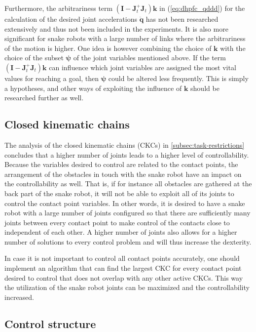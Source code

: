 Furthermore, the arbitrariness term $(\mathbf{I}-  \mathbf{J}_t^+ \mathbf{J}_t)\mathbf{k}$ in (\ref{eq:dhpfc_qddd}) for the calculation of the desired joint accelerations $\ddot{\mathbf{q}}$ has not been researched extensively and thus not been included in the experiments. It is also more significant for snake robots with a large number of links where the arbitrariness of the motion is higher. One idea is however combining the choice of $\mathbf{k}$ with the choice of the subset $\boldsymbol{\psi}$ of the joint variables mentioned above. If the term $(\mathbf{I}-  \mathbf{J}_t^+ \mathbf{J}_t)\mathbf{k}$ can influence which joint variables are assigned the most vital values for reaching a goal, then $\boldsymbol{\psi}$ could be altered less frequently. This is simply a hypotheses, and other ways of exploiting the influence of $\mathbf{k}$ should be researched further as well.

\subsection{Closed kinematic chains}

The analysis of the closed kinematic chains (CKCs) in \ref{subsec:task-restrictions} concludes that a higher number of joints leads to a higher level of controllability. Because the variables desired to control are related to the contact points, the arrangement of the obstacles in touch with the snake robot have an impact on the controllability as well. That is, if for instance all obstacles are gathered at the back part of the snake robot, it will not be able to exploit all of its joints to control the contact point variables. In other words, it is desired to have a snake robot with a large number of joints configured so that there are sufficiently many joints between every contact point to make control of the contacts close to independent of each other. A higher number of joints also allows for a higher number of solutions to every control problem and will thus increase the dexterity.

In case it is not important to control all contact points accurately, one should implement an algorithm that can find the largest CKC for every contact point desired to control that does not overlap with any other active CKCs. This way the utilization of the snake robot joints can be maximized and the controllability increased.

\subsection{Control structure}


